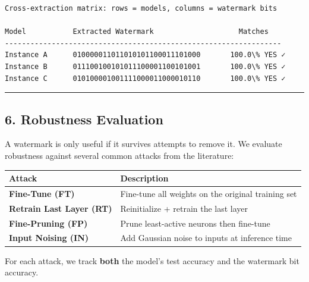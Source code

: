 \documentclass[11pt]{article}
\begin{document}
    \begin{Verbatim}[commandchars=\\\{\}]
Cross-extraction matrix: rows = models, columns = watermark bits

Model           Extracted Watermark                    Matches
-----------------------------------------------------------------
Instance A      010000011011010101100011101000       100.0\% YES ✓
Instance B      011100100101011100001100101001       100.0\% YES ✓
Instance C      010100001001111000011000010110       100.0\% YES ✓
    \end{Verbatim}

    \begin{center}\rule{0.5\linewidth}{0.5pt}\end{center}

\subsection{6. Robustness Evaluation}\label{robustness-evaluation}

A watermark is only useful if it survives attempts to remove it. We
evaluate robustness against several common attacks from the literature:

{\def\LTcaptype{none} %
\begin{longtable}[]{@{}
  >{\raggedright\arraybackslash}p{}
  >{\raggedright\arraybackslash}p{}@{}}
\toprule\noalign{}
\begin{minipage}[b]{\linewidth}\raggedright
Attack
\end{minipage} & \begin{minipage}[b]{\linewidth}\raggedright
Description
\end{minipage} \\
\midrule\noalign{}
\endhead
\bottomrule\noalign{}
\endlastfoot
\textbf{Fine-Tune (FT)} & Fine-tune all weights on the original training
set \\
\textbf{Retrain Last Layer (RT)} & Reinitialize + retrain the last
layer \\
\textbf{Fine-Pruning (FP)} & Prune least-active neurons then
fine-tune \\
\textbf{Input Noising (IN)} & Add Gaussian noise to inputs at inference
time \\
\end{longtable}
}

For each attack, we track \textbf{both} the model's test accuracy and
the watermark bit accuracy.
\end{document}
